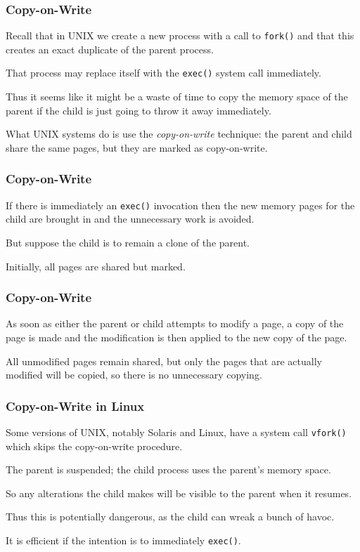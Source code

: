 \begin{frame}
\frametitle{Copy-on-Write}

Recall that in UNIX we create a new process with a call to \texttt{fork()} and that this creates an exact duplicate of the parent process. 

That process may replace itself with the \texttt{exec()} system call immediately. 

Thus it seems like it might be a waste of time to copy the memory space of the parent if the child is just going to throw it away immediately. 

What UNIX systems do is use the \textit{copy-on-write} technique: the parent and child share the same pages, but they are marked as copy-on-write.

\end{frame}

\begin{frame}
\frametitle{Copy-on-Write}

If there is immediately an \texttt{exec()} invocation then the new memory pages for the child are brought in and the unnecessary work is avoided. 

But suppose the child is to remain a clone of the parent.

Initially, all pages are shared but marked. 

\end{frame}

\begin{frame}
\frametitle{Copy-on-Write}

As soon as either the parent or child attempts to modify a page, a copy of the page is made and the modification is then applied to the new copy of the page. 

All unmodified pages remain shared, but only the pages that are actually modified will be copied, so there is no unnecessary copying.

\end{frame}



\begin{frame}
\frametitle{Copy-on-Write in Linux}

Some versions of UNIX, notably Solaris and Linux, have a system call \texttt{vfork()} which skips the copy-on-write procedure. 

The parent is suspended; the child process uses the parent's memory space. 

So any alterations the child makes will be visible to the parent when it resumes. 

Thus this is potentially dangerous, as the child can wreak a bunch of havoc.

It is efficient if the intention is to immediately \texttt{exec()}.


\end{frame}



